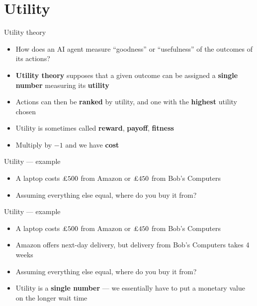 \part{Utility}
\frame{\partpage}

\renewcommand{\pounds}{\text{\textsterling}}

\begin{frame}{Utility theory}
    \begin{itemize}
        \pause\item How does an AI agent measure ``goodness'' or ``usefulness'' of the outcomes of its actions?
        \pause\item \textbf{Utility theory} supposes that a given outcome can be assigned a \textbf{single number} 
            measuring its \textbf{utility}
        \pause\item Actions can then be \textbf{ranked} by utility, and one with the \textbf{highest} utility chosen
        \pause\item Utility is sometimes called \textbf{reward}, \textbf{payoff}, \textbf{fitness}
        \pause\item Multiply by $-1$ and we have \textbf{cost}
    \end{itemize}
\end{frame}

\begin{frame}{Utility --- example}
    \begin{itemize}
        \pause\item A laptop costs $\pounds 500$ from Amazon or $\pounds 450$ from Bob's Computers
        \pause\item Assuming everything else equal, where do you buy it from?
    \end{itemize}
\end{frame}

\begin{frame}{Utility --- example}
    \begin{itemize}
        \pause\item A laptop costs $\pounds 500$ from Amazon or $\pounds 450$ from Bob's Computers
        \pause\item Amazon offers next-day delivery, but delivery from Bob's Computers takes 4 weeks
        \pause\item Assuming everything else equal, where do you buy it from?
        \pause\item Utility is a \textbf{single number} ---
            we essentially have to put a monetary value on the longer wait time
    \end{itemize}
\end{frame}

